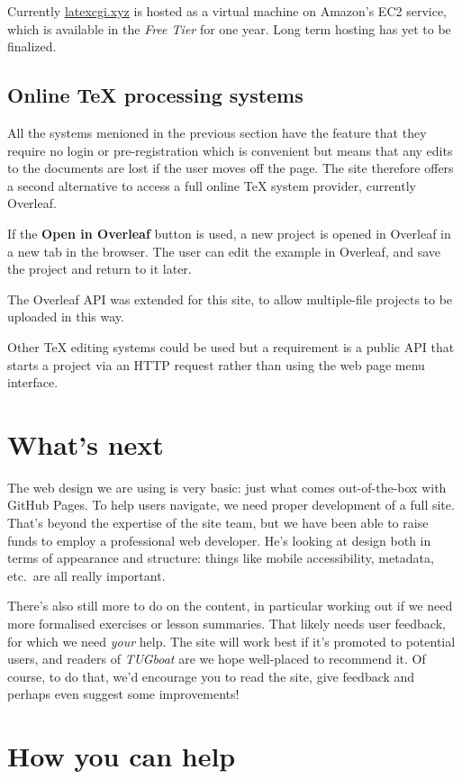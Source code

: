 \documentclass[harvardcite]{ltugboat}
\begin{document}
Currently \url{latexcgi.xyz} is hosted as a virtual machine on
Amazon's EC2 service, which is available in the \emph{Free Tier} for one
year. Long term hosting has yet to be finalized.

\subsection{Online \TeX{} processing systems}%
All the systems menioned in the previous section have the feature that
they require no login or pre-registration which is convenient but
means that any edits to the documents are lost if the user moves off
the page.  The site therefore offers a second alternative to access a
full online \TeX{} system provider, currently Overleaf.

If the \textbf{Open in Overleaf} button is used, a new project is
opened in Overleaf in a new tab in the browser. The user can edit the
example in Overleaf, and save the project and return to it later.

The Overleaf API was extended for this site, to allow multiple-file
projects to be uploaded in this way.

Other \TeX{} editing systems could be used but a requirement is a
public API that starts a project via an HTTP request rather than using
the web page menu interface.


\section{What's next}

The web design we are using is very basic: just what comes out-of-the-box with
GitHub Pages. To help users navigate, we need proper development of a full
site. That's beyond the expertise of the site team, but we have been able to
raise funds to employ a professional web developer. He's looking at design both
in terms of appearance and structure: things like mobile accessibility,
metadata, etc.\ are all really important.

There's also still more to do on the content, in particular working out if we
need more formalised exercises or lesson summaries. That likely needs user
feedback, for which we need \emph{your} help. The site will work best if it's
promoted to potential users, and readers of \emph{TUGboat} are we hope
well-placed to recommend it. Of course, to do that, we'd encourage you to read
the site, give feedback and perhaps even suggest some improvements!

\section{How you can help}


\makesignature
\end{document}
